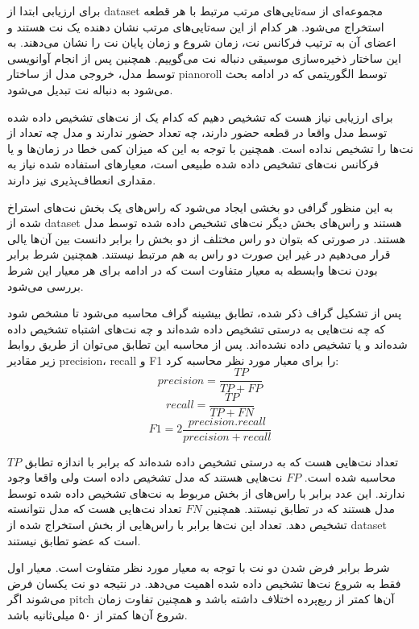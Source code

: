 برای ارزیابی ابتدا از \gls{dataset} مجموعه‌ای از سه‌تایی‌های مرتب مرتبط با هر
قطعه استخراج می‌شود. هر کدام از این سه‌تایی‌های مرتب نشان دهنده یک نت هستند و
اعضای آن به ترتیب فرکانس نت، زمان شروع و زمان پایان نت را نشان می‌دهند. به این
ساختار ذخیره‌سازی موسیقی دنباله نت می‌گوییم. همچنین پس از انجام آوانویسی توسط
مدل، خروجی مدل از ساختار \gls{pianoroll} توسط الگوریتمی که در ادامه بحث می‌شود
به دنباله نت تبدیل می‌شود.

برای ارزیابی نیاز هست که تشخیص دهیم که کدام یک از نت‌های تشخیص داده شده توسط مدل
واقعا در قطعه حضور دارند، چه تعداد حضور ندارند و مدل چه تعداد از نت‌ها را تشخیص
نداده است. همچنین با توجه به این که میزان کمی خطا در زمان‌ها و یا فرکانس نت‌های
تشخیص داده شده طبیعی است، معیارهای استفاده شده نیاز به مقداری انعطاف‌پذیری نیز
دارند.

به این منظور گرافی دو بخشی ایجاد می‌شود که راس‌های یک بخش نت‌های استراخ شده از
\gls{dataset} هستند و راس‌های بخش دیگر نت‌های تشخیص داده شده توسط مدل هستند. در
صورتی که بتوان دو راس مختلف از دو بخش را برابر دانست بین‌ آن‌ها یالی قرار
می‌دهیم در غیر این صورت دو راس به هم مرتبط نیستند. همچنین شرط برابر بودن نت‌ها
وابسطه به معیار متفاوت است که در ادامه برای هر معیار این شرط بررسی می‌شود.

پس از تشکیل گراف ذکر شده، تطابق بیشینه گراف محاسبه می‌شود تا مشخص شود که چه
نت‌هایی به درستی تشخیص داده شده‌اند و چه نت‌های اشتباه تشخیص داده شده‌اند و یا
تشخیص داده نشده‌اند. پس از محاسبه این تطابق می‌توان از طریق روابط زیر مقادیر
\gls{precision}، \gls{recall} و F1 را برای معیار مورد نظر محاسبه کرد:
\begin{equation}
    precision = \frac{TP}{TP + FP}
\end{equation}
\begin{equation}
    recall = \frac{TP}{TP + FN}
\end{equation}
\begin{equation}
    F1 = 2 \frac{precision . recall}{precision + recall}
\end{equation}

$TP$ تعداد نت‌هایی هست که به درستی تشخیص داده شده‌اند که برابر با اندازه تطابق
محاسبه شده است. $FP$ نت‌هایی هستند که مدل تشخیص داده است ولی واقعا وجود ندارند.
این عدد برابر با راس‌های از بخش مربوط به نت‌های تشخیص داده شده توسط مدل هستند که
در تطابق نیستند. همچنین $FN$ تعداد نت‌هایی هست که مدل نتوانسته تشخیص دهد. تعداد
این نت‌ها برابر با راس‌هایی از بخش استخراج شده از \gls{dataset} است که عضو تطابق
نیستند.

شرط برابر فرض شدن دو نت با توجه به معیار مورد نظر متفاوت است. معیار اول فقط به
شروع نت‌ها تشخیص داده شده اهمیت می‌دهد. در نتیجه دو نت یکسان فرض می‌شوند اگر
\gls{pitch} آن‌ها کمتر از ربع‌پرده اختلاف داشته باشد و همچنین تفاوت زمان شروع
آن‌ها کمتر از ۵۰ میلی‌ثانیه باشد.

